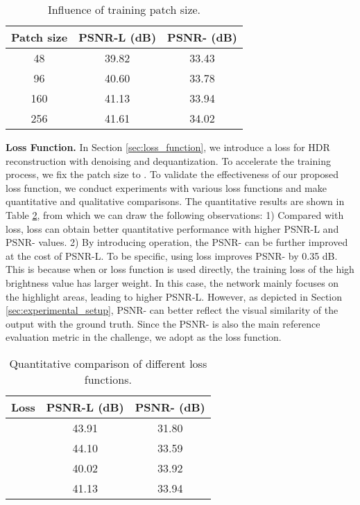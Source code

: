 \documentclass[final]{cvpr}
\begin{document}
\renewcommand\arraystretch{1.3}
\begin{table}[htbp]
	\begin{center}
		\begin{tabular}{ccc}
			\toprule
			Patch size & PSNR-L (dB) & PSNR- (dB) \\ \hline
			48 & 39.82 & 33.43 \\ 
			96 & 40.60 & 33.78 \\ 
			160 & 41.13 & 33.94 \\ 
			256 & 41.61 & 34.02 \\
			\bottomrule
		\end{tabular}
		
	\end{center}
\caption{Influence of training patch size.}
	\label{tab:patch_size}
	\vspace{-5pt}
\end{table}

\textbf{Loss Function.}
In Section \ref{sec:loss_function}, we introduce a  loss for HDR reconstruction with denoising and dequantization. To accelerate the training process, we fix the patch size to . To validate the effectiveness of our proposed loss function, we conduct experiments with various loss functions and make quantitative and qualitative comparisons. The quantitative results are shown in Table \ref{tab:loss_function}, from which we can draw the following observations: 1) Compared with  loss,  loss can obtain better quantitative performance with higher PSNR-L and PSNR- values. 2) By introducing  operation, the PSNR- can be further improved at the cost of PSNR-L. To be specific, using  loss improves PSNR- by 0.35 dB. This is because when  or  loss function is used directly, the training loss of the high brightness value has larger weight. In this case, the network mainly focuses on the highlight areas, leading to higher PSNR-L. However, as depicted in Section \ref{sec:experimental_setup}, PSNR- can better reflect the visual similarity of the output with the ground truth. Since the PSNR- is also the main reference evaluation metric in the challenge, we adopt  as the loss function. 

\begin{table}[htbp]
	\begin{center}
		\begin{tabular}{ccc}
	    \toprule
			Loss & PSNR-L (dB) & PSNR- (dB) \\ \hline
			 & 43.91 & 31.80 \\  & 44.10 & 33.59 \\  & 40.02 & 33.92 \\  & 41.13 & 33.94 \\ 
		\bottomrule
		\end{tabular}
	\end{center}

	\caption{Quantitative comparison of different loss functions.}
	\label{tab:loss_function}
	\vspace{-7pt}
\end{table}
\end{document}
